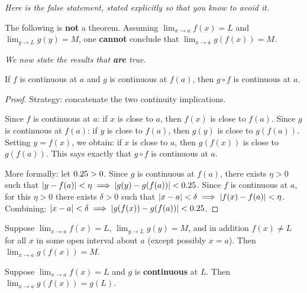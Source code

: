 \textit{Here is the false statement, stated explicitly so that you know to avoid it.}

\begin{remark}
The following is \textbf{not} a theorem.  Assuming $\lim_{x \to a} f(x) = L$ and $\lim_{y \to L} g(y) = M$, one \textbf{cannot} conclude that $\lim_{x \to a} g(f(x)) = M$.
\end{remark}

\textit{We now state the results that \textbf{are} true.}

\begin{theorem}
\label{thm:2-10}
If $f$ is continuous at $a$ and $g$ is continuous at $f(a)$, then $g \circ f$ is continuous at $a$.
\end{theorem}

\begin{proof}
Strategy: concatenate the two continuity implications.

Since $f$ is continuous at $a$: if $x$ is close to $a$, then $f(x)$ is close to $f(a)$.  Since $g$ is continuous at $f(a)$: if $y$ is close to $f(a)$, then $g(y)$ is close to $g(f(a))$.  Setting $y = f(x)$, we obtain: if $x$ is close to $a$, then $g(f(x))$ is close to $g(f(a))$.  This says exactly that $g \circ f$ is continuous at $a$.

More formally: let $0.25 > 0$.  Since $g$ is continuous at $f(a)$, there exists $\eta > 0$ such that $\left\lvert y - f(a) \right\rvert < \eta \implies \left\lvert g(y) - g(f(a)) \right\rvert < 0.25$.  Since $f$ is continuous at $a$, for this $\eta > 0$ there exists $\delta > 0$ such that $\left\lvert x - a \right\rvert < \delta \implies \left\lvert f(x) - f(a) \right\rvert < \eta$.  Combining: $\left\lvert x - a \right\rvert < \delta \implies \left\lvert g(f(x)) - g(f(a)) \right\rvert < 0.25$.
\end{proof}

\begin{theorem}
\label{thm:2-11}
Suppose $\lim_{x \to a} f(x) = L$, $\lim_{y \to L} g(y) = M$, and in addition $f(x) \neq L$ for all $x$ in some open interval about $a$ (except possibly $x = a$).  Then $\lim_{x \to a} g(f(x)) = M$.
\end{theorem}

\begin{theorem}
\label{thm:2-12}
Suppose $\lim_{x \to a} f(x) = L$ and $g$ is \textbf{continuous} at $L$.  Then $\lim_{x \to a} g(f(x)) = g(L)$.
\end{theorem}


